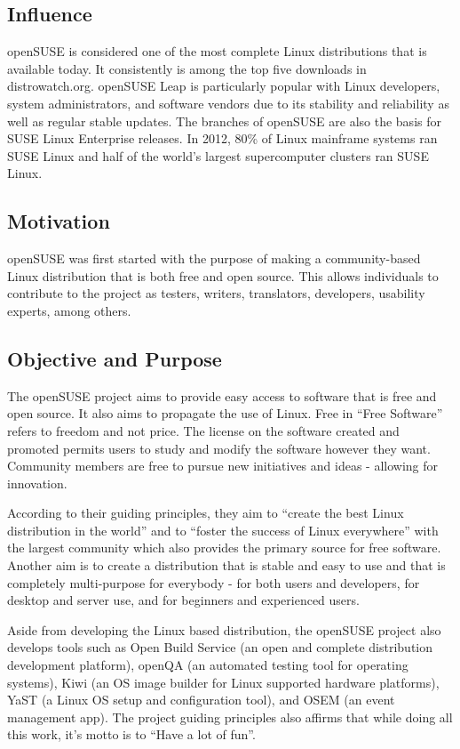 \documentclass{article}
\begin{document}
\subsection{Influence}
openSUSE is considered one of the most complete Linux distributions that is
available today. It consistently is among the top five downloads in
distrowatch.org. openSUSE Leap is particularly popular with Linux developers,
system administrators, and software vendors due to its stability and reliability
as well as regular stable updates. The branches of openSUSE are also the basis
for SUSE Linux Enterprise releases. In 2012, 80\% of Linux mainframe systems ran
SUSE Linux and half of the world’s largest supercomputer clusters ran SUSE
Linux.

\subsection{Motivation}
openSUSE was first started with the purpose of making a community-based Linux
distribution that is both free and open source. This allows individuals to
contribute to the project as testers, writers, translators, developers,
usability experts, among others.

\subsection{Objective and Purpose}
The openSUSE project aims to provide easy access to software that is free and
open source. It also aims to propagate the use of Linux. Free in “Free Software”
refers to freedom and not price. The license on the software created and
promoted permits users to study and modify the software however they want.
Community members are free to pursue new initiatives and ideas - allowing for
innovation.

According to their guiding principles, they aim to “create the best Linux
distribution in the world” and to “foster the success of Linux everywhere” with
the largest community which also provides the primary source for free software.
Another aim is to create a distribution that is stable and easy to use and that
is completely multi-purpose for everybody - for both users and developers, for
desktop and server use, and for beginners and experienced users.

Aside from developing the Linux based distribution, the openSUSE project also
develops tools such as Open Build Service (an open and complete distribution
development platform), openQA (an automated testing tool for operating systems),
Kiwi (an OS image builder for Linux supported hardware platforms), YaST (a Linux
OS setup and configuration tool), and OSEM (an event management app). The
project guiding principles also affirms that while doing all this work, it’s
motto is to “Have a lot of fun”.
\end{document}
